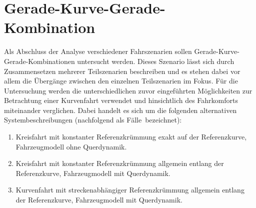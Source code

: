 \section{Gerade-Kurve-Gerade-Kombination}
Als Abschluss der Analyse verschiedener Fahrszenarien sollen Gerade-Kurve-Gerade-Kombinationen untersucht werden. Dieses Szenario lässt sich durch Zusammensetzen mehrerer Teilszenarien beschreiben und es stehen dabei vor allem die Übergänge zwischen den einzelnen Teilszenarien im Fokus. Für die Untersuchung werden die unterschiedlichen zuvor eingeführten Möglichkeiten zur Betrachtung einer Kurvenfahrt verwendet und hinsichtlich des Fahrkomforts miteinander verglichen. Dabei handelt es sich um die folgenden alternativen Systembeschreibungen (nachfolgend als \glqq Fälle\grqq~bezeichnet): 
\begin{enumerate}
	\item Kreisfahrt mit konstanter Referenzkrümmung exakt auf der Referenzkurve, Fahrzeugmodell ohne Querdynamik.
	\item Kreisfahrt mit konstanter Referenzkrümmung allgemein entlang der Referenzkurve, Fahrzeugmodell mit Querdynamik.
	\item Kurvenfahrt mit streckenabhängiger Referenzkrümmung allgemein entlang der Referenzkurve, Fahrzeugmodell mit Querdynamik.
\end{enumerate}
